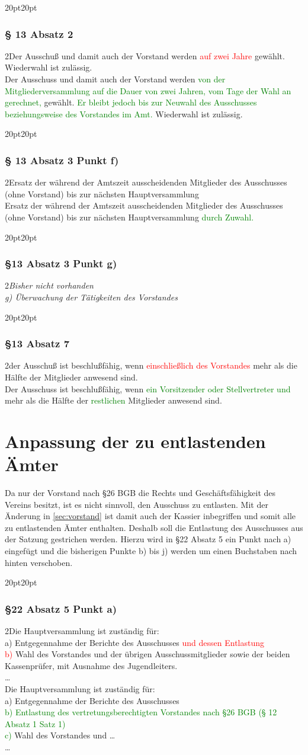 \documentclass[10pt,a4paper,parskip=half]{scrartcl}
\newcommand{\new}[1]{\textcolor{Green}{#1}}
\newcommand{\old}[1]{\textcolor{Red}{#1}}
\newcommand{\change}[1]{
  \begin{adjustwidth}{20pt}{20pt}
    #1
  \end{adjustwidth}
}
\newcommand{\compare}[3]{\change{\subsubsection*{#1}\begin{multicols}{2}#2\columnbreak\\#3\end{multicols}}}
\begin{document}
\compare{§ 13 Absatz 2}{Der Ausschuß und damit auch der Vorstand werden \old{auf zwei Jahre} gewählt. Wiederwahl ist zulässig.}{Der Ausschuss und damit auch der Vorstand werden \new{von der Mitgliederversammlung auf die Dauer von zwei Jahren,
    vom Tage der Wahl an gerechnet,} gewählt. \new{Er bleibt jedoch bis zur Neuwahl des Ausschusses beziehungsweise des Vorstandes im Amt.}
  Wiederwahl ist zulässig.}

\compare{§ 13 Absatz 3 Punkt f)}{Ersatz der während der Amtszeit ausscheidenden Mitglieder des Ausschusses (ohne Vorstand) bis zur nächsten Hauptversammlung}{Ersatz der während der Amtszeit ausscheidenden Mitglieder des Ausschusses (ohne Vorstand) bis zur nächsten Hauptversammlung \new{durch Zuwahl.}}

\compare{§13 Absatz 3 Punkt g)}
{\em Bisher nicht vorhanden \em}
{g) Überwachung der Tätigkeiten des Vorstandes}

\compare{§13 Absatz 7}
{der Ausschuß ist beschlußfähig, wenn \old{einschließlich des Vorstandes} mehr als die Hälfte der Mitglieder anwesend sind.}
{Der Ausschuss ist beschlußfähig,
  wenn \new{ein Vorsitzender oder Stellvertreter und} mehr als die Hälfte der \new{restlichen} Mitglieder anwesend sind.}

\clearpage
\section{Anpassung der zu entlastenden Ämter}
Da nur der Vorstand nach §26 BGB die Rechts und Geschäftsfähigkeit des Vereins besitzt, ist es nicht sinnvoll, den Ausschuss zu entlasten. Mit der Änderung in \autoref*{sec:vorstand} ist damit auch der Kassier inbegriffen und somit alle zu entlastenden Ämter enthalten. Deshalb soll die Entlastung des Ausschusses aus der Satzung gestrichen werden. Hierzu wird in §22 Absatz 5 ein Punkt nach a) eingefügt und die bisherigen Punkte b) bis j) werden um einen Buchstaben nach hinten verschoben.

\compare{§22 Absatz 5 Punkt a)}
{Die Hauptversammlung ist zuständig für: \\a) Entgegennahme der Berichte des Ausschusses \old{und dessen Entlastung}\\
  \old{b)} Wahl des Vorstandes und der übrigen Ausschussmitglieder sowie der beiden Kassenprüfer, mit Ausnahme des Jugendleiters.\\\dots}
{Die Hauptversammlung ist zuständig für: \\a) Entgegennahme der Berichte des Ausschusses\\
  \new{b) Entlastung des vertretungsberechtigten Vorstandes nach §26 BGB (§ 12 Absatz 1 Satz 1)}\\
  \new{c)} Wahl des Vorstandes und \dots \\\dots}
\clearpage
\end{document}
